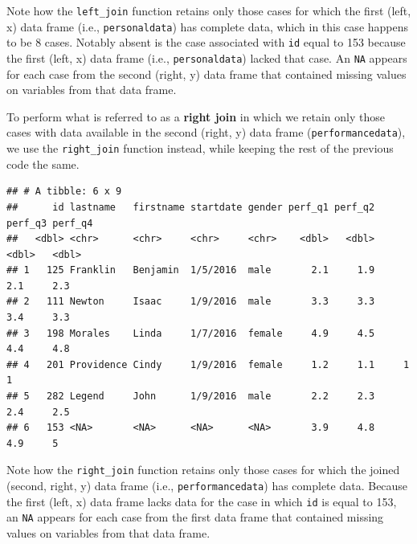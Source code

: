 \documentclass[]{book}
\newenvironment{Shaded}{\begin{snugshade}}{\end{snugshade}}
\newcommand{\KeywordTok}[1]{\textcolor[rgb]{0.13,0.29,0.53}{\textbf{#1}}}
\newcommand{\DataTypeTok}[1]{\textcolor[rgb]{0.13,0.29,0.53}{#1}}
\newcommand{\StringTok}[1]{\textcolor[rgb]{0.31,0.60,0.02}{#1}}
\newcommand{\CommentTok}[1]{\textcolor[rgb]{0.56,0.35,0.01}{\textit{#1}}}
\newcommand{\OperatorTok}[1]{\textcolor[rgb]{0.81,0.36,0.00}{\textbf{#1}}}
\newcommand{\NormalTok}[1]{#1}
\begin{document}
Note how the \texttt{left\_join} function retains only those cases for
which the first (left, x) data frame (i.e., \texttt{personaldata}) has
complete data, which in this case happens to be 8 cases. Notably absent
is the case associated with \texttt{id} equal to 153 because the first
(left, x) data frame (i.e., \texttt{personaldata}) lacked that case. An
\texttt{NA} appears for each case from the second (right, y) data frame
that contained missing values on variables from that data frame.

To perform what is referred to as a \textbf{right join} in which we
retain only those cases with data available in the second (right, y)
data frame (\texttt{performancedata}), we use the \texttt{right\_join}
function instead, while keeping the rest of the previous code the same.

\begin{Shaded}
\end{Shaded}

\begin{verbatim}
## # A tibble: 6 x 9
##      id lastname   firstname startdate gender perf_q1 perf_q2 perf_q3 perf_q4
##   <dbl> <chr>      <chr>     <chr>     <chr>    <dbl>   <dbl>   <dbl>   <dbl>
## 1   125 Franklin   Benjamin  1/5/2016  male       2.1     1.9     2.1     2.3
## 2   111 Newton     Isaac     1/9/2016  male       3.3     3.3     3.4     3.3
## 3   198 Morales    Linda     1/7/2016  female     4.9     4.5     4.4     4.8
## 4   201 Providence Cindy     1/9/2016  female     1.2     1.1     1       1  
## 5   282 Legend     John      1/9/2016  male       2.2     2.3     2.4     2.5
## 6   153 <NA>       <NA>      <NA>      <NA>       3.9     4.8     4.9     5
\end{verbatim}

Note how the \texttt{right\_join} function retains only those cases for
which the joined (second, right, y) data frame (i.e.,
\texttt{performancedata}) has complete data. Because the first (left, x)
data frame lacks data for the case in which \texttt{id} is equal to 153,
an \texttt{NA} appears for each case from the first data frame that
contained missing values on variables from that data frame.
\end{document}
